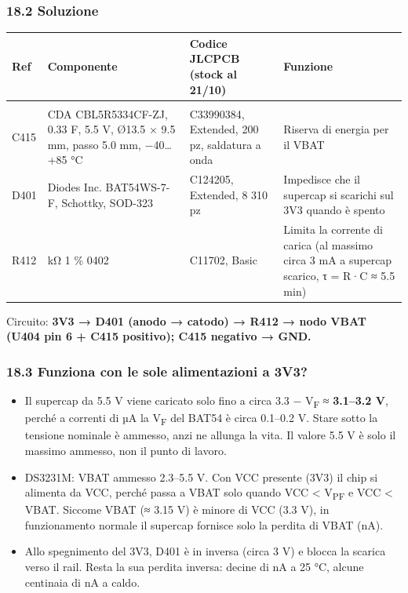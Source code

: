 \subsubsection[18.2 Soluzione]{18.2 Soluzione}

{\footnotesize{}\setlength{\tabcolsep}{4pt}\renewcommand{\arraystretch}{1.1}
\begin{xltabular}{\linewidth}{>{\hsize\raggedright\arraybackslash}X>{\hsize\raggedright\arraybackslash}X>{\hsize\raggedright\arraybackslash}X>{\hsize\raggedright\arraybackslash}X}
\toprule
\textbf{Ref} & \textbf{Componente} & \textbf{Codice JLCPCB (stock al 21/\allowbreak{}10)} & \textbf{Funzione} \\
\midrule
\endhead
\midrule[0.15pt]\\\bottomrule\endfoot
\bottomrule\endlastfoot
C415 & CDA CBL5R5334CF-ZJ, 0.33 F, 5.5 V, Ø13.5 × 9.5 mm, passo 5.0 mm, −40…+85 °C & C33990384, Extended, 200 pz, saldatura a onda & Riserva di energia per il VBAT \\\midrule[0.15pt]
D401 & Diodes Inc. BAT54WS-7-F, Schottky, SOD-323 & C124205, Extended, 8 310 pz & Impedisce che il supercap si scarichi sul 3V3 quando è spento \\\midrule[0.15pt]
R412 & 1 kΩ 1 \% 0402 & C11702, Basic & Limita la corrente di carica (al massimo circa 3 mA a supercap scarico, τ = R·C ≈ 5.5 min) \\
\end{xltabular}}

Circuito: \textbf{3V3 → D401 (anodo → catodo) → R412 → nodo VBAT (U404 pin 6 + C415 positivo); C415 negativo → GND.}

\subsubsection[18.3 Funziona con le sole alimentazioni a 3V3?]{18.3 Funziona con le sole alimentazioni a 3V3?}

\begin{itemize}
\item Il supercap da 5.5 V viene caricato solo fino a circa 3.3 − V\textsubscript{F} ≈ \textbf{3.1–3.2 V}, perché a correnti di µA la V\textsubscript{F} del BAT54 è circa 0.1–0.2 V. Stare sotto la tensione nominale è ammesso, anzi ne allunga la vita. Il valore 5.5 V è solo il massimo ammesso, non il punto di lavoro.
\item DS3231M: VBAT ammesso 2.3–5.5 V. Con VCC presente (3V3) il chip si alimenta da VCC, perché passa a VBAT solo quando VCC < V\textsubscript{PF} e VCC < VBAT. Siccome VBAT (≈ 3.15 V) è minore di VCC (3.3 V), in funzionamento normale il supercap fornisce solo la perdita di VBAT (nA).
\item Allo spegnimento del 3V3, D401 è in inversa (circa 3 V) e blocca la scarica verso il rail. Resta la sua perdita inversa: decine di nA a 25 °C, alcune centinaia di nA a caldo.
\end{itemize}

